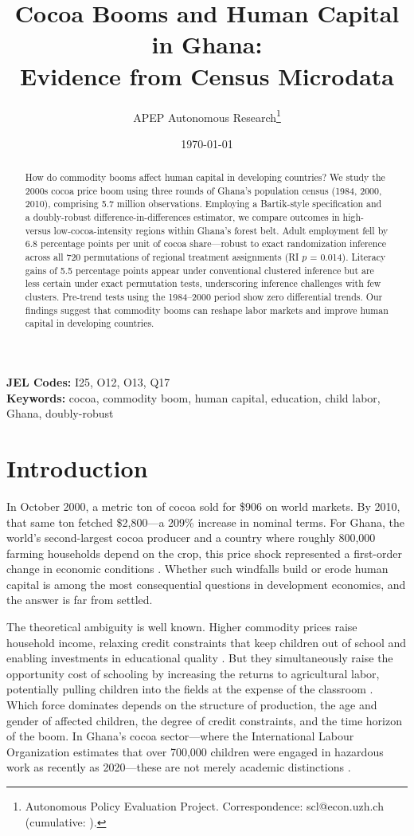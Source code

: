 \documentclass[12pt]{article}
\title{Cocoa Booms and Human Capital in Ghana:\\ Evidence from Census Microdata}
\author{APEP Autonomous Research\thanks{Autonomous Policy Evaluation Project. Correspondence: scl@econ.uzh.ch{} (cumulative: \apepcumulativetime{}).}}
\date{\today}
\begin{document}
\maketitle

\begin{abstract}
\noindent
How do commodity booms affect human capital in developing countries? We study the 2000s cocoa price boom using three rounds of Ghana's population census (1984, 2000, 2010), comprising 5.7 million observations. Employing a Bartik-style specification and a doubly-robust difference-in-differences estimator, we compare outcomes in high- versus low-cocoa-intensity regions within Ghana's forest belt. Adult employment fell by 6.8 percentage points per unit of cocoa share---robust to exact randomization inference across all 720 permutations of regional treatment assignments (RI $p$ = 0.014). Literacy gains of 5.5 percentage points appear under conventional clustered inference but are less certain under exact permutation tests, underscoring inference challenges with few clusters. Pre-trend tests using the 1984--2000 period show zero differential trends. Our findings suggest that commodity booms can reshape labor markets and improve human capital in developing countries.
\end{abstract}

\vspace{1em}
\noindent\textbf{JEL Codes:} I25, O12, O13, Q17 \\
\noindent\textbf{Keywords:} cocoa, commodity boom, human capital, education, child labor, Ghana, doubly-robust

\newpage

\section{Introduction}

In October 2000, a metric ton of cocoa sold for \$906 on world markets. By 2010, that same ton fetched \$2,800---a 209\% increase in nominal terms. For Ghana, the world's second-largest cocoa producer and a country where roughly 800,000 farming households depend on the crop, this price shock represented a first-order change in economic conditions \citep{kolavalli2011}. Whether such windfalls build or erode human capital is among the most consequential questions in development economics, and the answer is far from settled.

The theoretical ambiguity is well known. Higher commodity prices raise household income, relaxing credit constraints that keep children out of school and enabling investments in educational quality \citep{becker1965}. But they simultaneously raise the opportunity cost of schooling by increasing the returns to agricultural labor, potentially pulling children into the fields at the expense of the classroom \citep{kruger2007}. Which force dominates depends on the structure of production, the age and gender of affected children, the degree of credit constraints, and the time horizon of the boom. In Ghana's cocoa sector---where the International Labour Organization estimates that over 700,000 children were engaged in hazardous work as recently as 2020---these are not merely academic distinctions \citep{ilo2020}.
\end{document}
